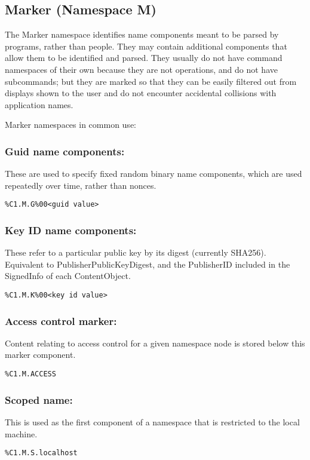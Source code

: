 \subsection*{Marker (Namespace M)}


 The Marker namespace identifies name components meant to be parsed by programs, rather than people. They may contain additional components that allow them to be identified and parsed. They usually do not have command namespaces of their own because they are not operations, and do not have subcommands; but they are marked so that they can be easily filtered out from displays shown to the user and do not encounter accidental collisions with application names.


 Marker namespaces in common use:
\subsubsection*{Guid name components:}


 These are used to specify fixed random binary name components, which are used repeatedly over time, rather than nonces.
\begin{verbatim}
%C1.M.G%00<guid value>
\end{verbatim}
\subsubsection*{Key ID name components:}


 These refer to a particular public key by its digest (currently SHA256). Equivalent to PublisherPublicKeyDigest, and the PublisherID included in the SignedInfo of each ContentObject.
\begin{verbatim}
%C1.M.K%00<key id value>
\end{verbatim}
\subsubsection*{Access control marker:}


 Content relating to access control for a given namespace node is stored below this marker component.
\begin{verbatim}
%C1.M.ACCESS
\end{verbatim}
\subsubsection*{Scoped name:}


 This is used as the first component of a namespace that is restricted to the local machine.
\begin{verbatim}
%C1.M.S.localhost
\end{verbatim}


